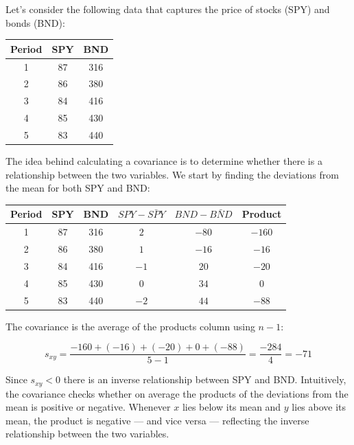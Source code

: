 \documentclass[
  11pt,
  letterpaper,
  DIV=11,
  numbers=noendperiod,
  oneside,
  open=any]{scrreprt}
\begin{document}
\begin{bsexample}[Example]

Let's consider the following data that captures the price of stocks
(SPY) and bonds (BND):

\begin{center}
\begin{tabular}{ccc}
\toprule
Period & SPY & BND \\
\midrule
1 & 87 & 316 \\
2 & 86 & 380 \\
3 & 84 & 416 \\
4 & 85 & 430 \\
5 & 83 & 440 \\
\bottomrule
\end{tabular}
\end{center}

The idea behind calculating a covariance is to determine whether there
is a relationship between the two variables. We start by finding the
deviations from the mean for both SPY and BND:

\begin{center}
\begin{tabular}{cccccc}
\toprule
Period & SPY & BND & \(SPY - \bar{SPY}\) & \(BND - \bar{BND}\) & Product \\
\midrule
1 & 87 & 316 & \(2\) & \(-80\) & \(-160\) \\
2 & 86 & 380 & \(1\) & \(-16\) & \(-16\) \\
3 & 84 & 416 & \(-1\) & \(20\) & \(-20\) \\
4 & 85 & 430 & \(0\) & \(34\) & \(0\) \\
5 & 83 & 440 & \(-2\) & \(44\) & \(-88\) \\
\bottomrule
\end{tabular}
\end{center}

The covariance is the average of the products column using \(n-1\):

\[s_{xy} = \frac{-160 + (-16) + (-20) + 0 + (-88)}{5-1} =
\frac{-284}{4} = -71\]

Since \(s_{xy} < 0\) there is an inverse relationship between SPY and
BND. Intuitively, the covariance checks whether on average the products
of the deviations from the mean is positive or negative. Whenever \(x\)
lies below its mean and \(y\) lies above its mean, the product is
negative --- and vice versa --- reflecting the inverse relationship
between the two variables.

\end{bsexample}
\end{document}
